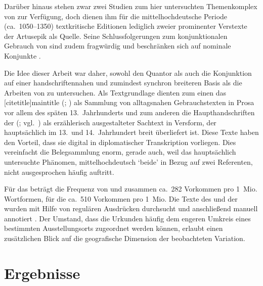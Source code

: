 Darüber hinaus stehen zwar zwei Studien zum hier untersuchten Themenkomplex von
\citet{askedal1973,askedal1974} zur Verfügung, doch dienen ihm für die
mittelhochdeutsche Periode (ca.~1050--1350) textkritische
Editionen lediglich zweier prominenter Verstexte der
Artusepik als Quelle. Seine Schlussfolgerungen zum konjunktionalen Gebrauch von
 \autocite{askedal1974} sind zudem fragwürdig und beschränken sich
auf nominale Konjunkte \autocite{gjelsten1980}.

Die Idee dieser Arbeit war daher, sowohl den Quantor als auch die Konjunktion
 auf einer handschriftennahen und zumindest synchron breiteren
Basis als die Arbeiten von \citet{askedal1973,askedal1974} zu untersuchen. Als
Textgrundlage dienten zum einen das [citetitle]{maintitle}
(\CAO{}; \nosh\cites{cao1,cao2,cao3,cao4,caor,cao5}) als Sammlung von
alltagsnahen Gebrauchstexten in Prosa vor allem des späten 13.~Jahrhunderts und
zum anderen die Haupthandschriften der  (\KC{};
vgl.~\cites{schroeder1895,nellmann1983}) als erzählerisch ausgestalteter
Sachtext in Versform, der hauptsächlich im 13.\ und 14.\ Jahrhundert breit
über\-liefert ist. Diese Texte haben den Vorteil, dass sie digital in
diplomatischer Transkription vorliegen. Dies vereinfacht die Belegsammlung
enorm, gerade auch, weil das hauptsächlich untersuchte Phänomen,
mittelhochdeutsch  `beide' in Bezug auf zwei
Referenten, nicht ausgesprochen häufig auftritt.

Für das \CAO{} beträgt die Frequenz von  und
 zusammen ca.~282 Vorkommen pro 1~Mio. Wortformen, für die \KC{}
ca.~510 Vorkommen pro 1~Mio. Die Texte des \CAO{} und der \KC{} wurden mit
Hilfe von regulären Ausdrücken durchsucht und anschließend manuell annotiert
\autocites[vgl.\ z.\,B.][33--37]{perkuhnetal2012}[zur Methode
vgl.][207--209]{beckerschallert2021}[155--158]{beckerschallert2022b}. Der
Umstand, dass die Urkunden häufig dem engeren Umkreis eines bestimmten
Ausstellungs\-orts zugeordnet werden können, erlaubt einen zusätzlichen Blick
auf die geografische Dimension der beobachteten Variation.

\section{Ergebnisse}

